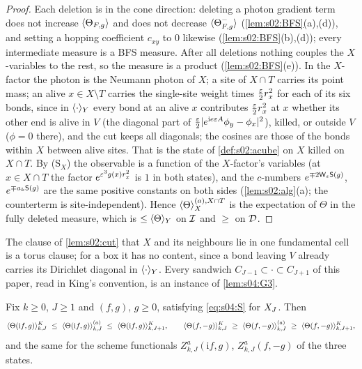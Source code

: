 \begin{proof}
Each deletion is in the cone direction: deleting a photon gradient term does not increase $\langle \Theta_{F,g}\rangle$ and does not decrease $\langle \Theta^-_{F,g}\rangle$ (\cref{lem:s02:BFS}(a),(d)), and setting a hopping coefficient $c_{xy}$ to $0$ likewise (\cref{lem:s02:BFS}(b),(d)); every intermediate measure is a BFS measure. After all deletions nothing couples the $X$-variables to the rest, so the measure is a product (\cref{lem:s02:BFS}(e)). In the $X$-factor the photon is the Neumann photon of $X$; a site of $X\cap T$ carries its point mass; an alive $x\in X\setminus T$ carries the single-site weight times $\frac{\varepsilon}2r_x^2$ for each of its six bonds, since in $\langle \cdot\rangle_Y$ every bond at an alive $x$ contributes $\frac{\varepsilon}2r_x^2$ at $x$ whether its other end is alive in $V$ (the diagonal part of $\frac{\varepsilon}2|e^{\mathrm ie\varepsilon A}\phi_y-\phi_x|^2$), killed, or outside $V$ ($\phi=0$ there), and the cut keeps all diagonals; the cosines are those of the bonds within $X$ between alive sites. That is the state of \cref{def:s02:acube} on $X$ killed on $X\cap T$. By (S$_X$) the observable is a function of the $X$-factor's variables (at $x\in X\cap T$ the factor $e^{\varepsilon^3g(x)r_x^2}$ is $1$ in both states), and the $c$-numbers $e^{\mp2\mathsf W_{\varepsilon}\mathsf S(g)}$, $e^{\mp a_k\mathsf S(g)}$ are the same positive constants on both sides (\cref{lem:s02:alg}(a); the counterterm is site-independent). Hence $\langle \Theta\rangle^{(a),X\cap T}_X$ is the expectation of $\Theta$ in the fully deleted measure, which is $\le\langle \Theta\rangle_Y$ on $\mathcal I$ and $\ge$ on $\mathcal D$.
\end{proof}

The clause of \cref{lem:s02:cut} that $X$ and its neighbours lie in one fundamental cell is a torus clause; for a box it has no content, since a bond leaving $V$ already carries its Dirichlet diagonal in $\langle \cdot\rangle_Y$. Every sandwich $C_{J-1}\subset\cdot\subset C_{J+1}$ of this paper, read in King's convention, is an instance of \cref{lem:s04:G3}.

\begin{lemma}\label{lem:s04:G}
Fix $k\ge0$, $J\ge1$ and $(f,g)$, $g\ge0$, satisfying \eqref{eq:s04:S} for $X_J$. Then
\[
\avK{\Theta(\mathrm if,g)}\ \le\ \ava{\Theta(\mathrm if,g)}\ \le\ \langle\Theta(\mathrm if,g)\rangle^{K}_{k,J+1},\qquad
\avK{\Theta(f,-g)}\ \ge\ \ava{\Theta(f,-g)}\ \ge\ \langle\Theta(f,-g)\rangle^{K}_{k,J+1},
\]
and the same for the scheme functionals $Z^a_{k,J}(\mathrm if,g)$, $Z^a_{k,J}(f,-g)$ of the three states.
\end{lemma}

